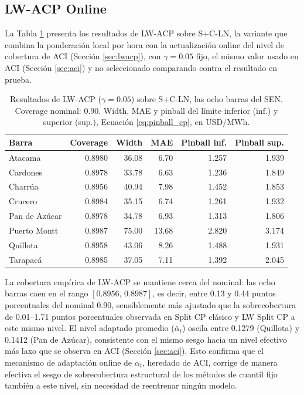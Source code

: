 \subsection{LW-ACP Online}
\label{sec:lwacp_resultados}

La Tabla \ref{tab:lwacp_resultados} presenta los resultados de LW-ACP sobre S+C-LN, la variante que combina la ponderación local por hora con la actualización online del nivel de cobertura de ACI (Sección \ref{sec:lwacp}), con $\gamma = 0.05$ fijo, el mismo valor usado en ACI (Sección \ref{sec:aci}) y no seleccionado comparando contra el resultado en prueba.

\begin{table}[htbp]
    \centering
    \small
    \begin{tabular}{lrrrrr}
        \toprule
        Barra & Coverage & Width & MAE & Pinball inf. & Pinball sup. \\
        \midrule
        Atacama       & 0.8980 & 36.08 & 6.70  & 1.257 & 1.939 \\
        Cardones      & 0.8978 & 33.78 & 6.63  & 1.236 & 1.849 \\
        Charrúa       & 0.8956 & 40.94 & 7.98  & 1.452 & 1.853 \\
        Crucero       & 0.8984 & 35.15 & 6.74  & 1.261 & 1.932 \\
        Pan de Azúcar & 0.8978 & 34.78 & 6.93  & 1.313 & 1.806 \\
        Puerto Montt  & 0.8987 & 75.00 & 13.68 & 2.820 & 3.174 \\
        Quillota      & 0.8958 & 43.06 & 8.26  & 1.488 & 1.931 \\
        Tarapacá      & 0.8985 & 37.05 & 7.11  & 1.392 & 2.045 \\
        \bottomrule
    \end{tabular}
    \caption{Resultados de LW-ACP ($\gamma = 0.05$) sobre S+C-LN, las ocho barras del SEN. Coverage nominal: 0.90. Width, MAE y pinball del límite inferior (inf.) y superior (sup.), Ecuación \ref{eq:pinball_cp}, en USD/MWh.}
    \label{tab:lwacp_resultados}
\end{table}

La cobertura empírica de LW-ACP se mantiene cerca del nominal: las ocho barras caen en el rango $[0.8956,\, 0.8987]$, es decir, entre 0.13 y 0.44 puntos porcentuales del nominal 0.90, sensiblemente más ajustado que la sobrecobertura de 0.01--1.71 puntos porcentuales observada en Split CP clásico y LW Split CP a este mismo nivel. El nivel adaptado promedio ($\bar\alpha_t$) oscila entre 0.1279 (Quillota) y 0.1412 (Pan de Azúcar), consistente con el mismo sesgo hacia un nivel efectivo más laxo que se observa en ACI (Sección \ref{sec:aci}). Esto confirma que el mecanismo de adaptación online de $\alpha_t$, heredado de ACI, corrige de manera efectiva el sesgo de sobrecobertura estructural de los métodos de cuantil fijo también a este nivel, sin necesidad de reentrenar ningún modelo.

